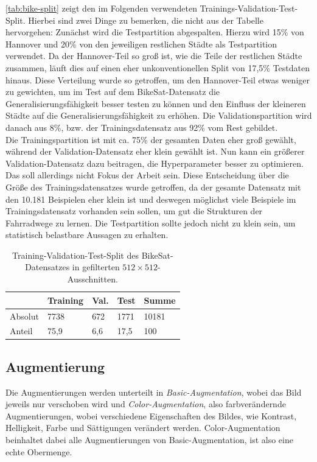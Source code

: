 \autoref{tab:bike-split} zeigt den im Folgenden verwendeten Trainings-Validation-Test-Split. 
Hierbei sind zwei Dinge zu bemerken, die nicht aus der Tabelle hervorgehen: 
Zunächst wird die Testpartition abgespalten. Hierzu wird 15\% von Hannover und 
20\% von den jeweiligen restlichen Städte als Testpartition verwendet. Da der Hannover-Teil so groß ist, wie die Teile der
restlichen Städte zusammen, läuft dies auf einen eher unkonventionellen Split von 17,5\% Testdaten hinaus. Diese Verteilung wurde so getroffen, 
um den Hannover-Teil etwas weniger zu gewichten, um im Test auf dem BikeSat-Datensatz die Generalisierungsfähigkeit besser testen zu können
und den Einfluss der kleineren Städte auf die Generalisierungsfähigkeit zu erhöhen. Die Validationspartition wird danach aus 8\%, 
bzw. der Trainingsdatensatz aus 92\% vom Rest gebildet. \\
Die Trainingspartition ist mit ca. 75\% der gesamten Daten eher groß gewählt, während der Validation-Datensatz eher klein gewählt ist. 
Nun kann ein größerer Validation-Datensatz dazu beitragen, die Hyperparameter besser zu optimieren. Das soll allerdings nicht Fokus der Arbeit sein.
Diese Entscheidung über die Größe des Trainingsdatensatzes wurde getroffen,
da der gesamte Datensatz mit den 10.181 Beispielen eher klein ist und deswegen möglichst viele Beispiele 
im Trainingsdatensatz vorhanden sein sollen, um gut die Strukturen der Fahrradwege zu lernen. 
Die Testpartition sollte jedoch nicht zu klein sein, um statistisch belastbare Aussagen zu erhalten.

\begin{table}
	\centering
	\begin{tabular}{l|l|l|l|l}
		& Training & Val. & Test & Summe \\
		\midrule
		Absolut & 7738 & 672 & 1771 & 10181 \\
		Anteil & 75,9 & 6,6 & 17,5 & 100 \\ 
	\end{tabular}
	\caption{Training-Validation-Test-Split des BikeSat-Datensatzes in gefilterten $512{\times}512$-Ausschnitten.}
	\label{tab:bike-split}
\end{table}


\subsection{Augmentierung}

Die Augmentierungen werden unterteilt in \textit{Basic-Augmentation}, wobei das Bild jeweils nur verschoben wird und 
\textit{Color-Augmentation}, also farbverändernde Augmentierungen, wobei verschiedene Eigenschaften des Bildes,
wie Kontrast, Helligkeit, Farbe und Sättigungen verändert werden. Color-Augmentation beinhaltet dabei alle 
Augmentierungen von Basic-Augmentation, ist also eine echte Obermenge.

